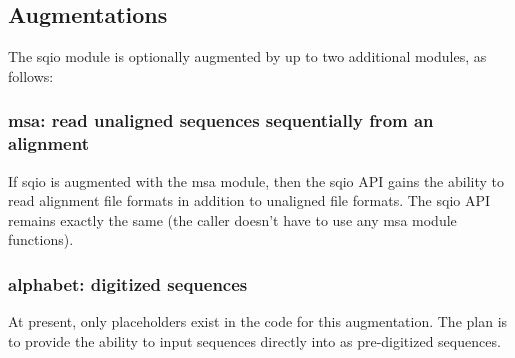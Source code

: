 \subsection{Augmentations}

The sqio module is optionally augmented by up to two additional
modules, as follows:

\subsubsection{msa: read unaligned sequences sequentially from an alignment}

If sqio is augmented with the msa module, then the sqio API gains the
ability to read alignment file formats in addition to unaligned file
formats. The sqio API remains exactly the same (the caller doesn't
have to use any msa module functions).

\subsubsection{alphabet: digitized sequences}

At present, only placeholders exist in the code for this augmentation.
The plan is to provide the ability to input sequences directly into
 as pre-digitized sequences.






